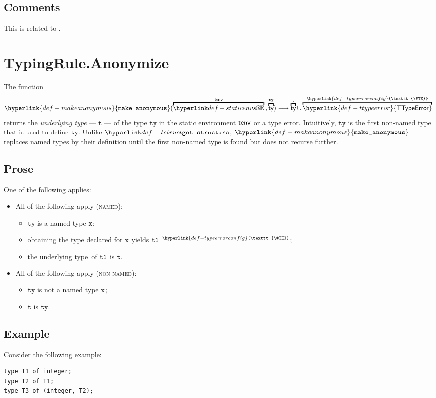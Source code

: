 \documentclass{book}
\newcommand\TTypeError[0]{\hyperlink{def-ttypeerror}{\textsf{TTypeError}}}
\newcommand\TypeErrorConfig[0]{\hyperlink{def-typeerrorconfig}{\texttt{\#TE}}}
\newcommand\ProseOrTypeError[0]{\hyperlink{def-proseortypeerror}{$^{\TypeErrorConfig}$}}
\newcommand\makeanonymous[0]{\hyperlink{def-makeanonymous}{\texttt{make\_anonymous}}}
\newcommand\underlyingtype[0]{\hyperlink{def-underlyingtype}{underlying type}}
\newcommand\vt[0]{\texttt{t}}
\newcommand\tty[0]{\texttt{ty}}
\begin{document}
\subsection{Comments}
This is related to .

\section{TypingRule.Anonymize \label{sec:anonymize}}
\hypertarget{def-makeanonymous}{}
\hypertarget{def-underlyingtype}{}
The function
\[
  \makeanonymous(\overname{\staticenvs}{\tenv} \aslsep \overname{\ty}{\tty}) \aslto \overname{\ty}{\vt} \cup \overname{\TTypeError}{\TypeErrorConfig}
\]
returns the \emph{\underlyingtype} --- $\vt$ --- of the type $\tty$ in the static environment $\textsf{tenv}$ or a type error.
Intuitively, $\tty$ is the first non-named type that is used to define $\tty$. Unlike $\tstruct$,
$\makeanonymous$ replaces named types by their definition until the first non-named type is found but
does not recurse further.

\subsection{Prose}
One of the following applies:
\begin{itemize}
  \item All of the following apply (\textsc{named}):
  \begin{itemize}
    \item $\tty$ is a named type $\texttt{x}$;
    \item obtaining the type declared for $\texttt{x}$ yields $\texttt{t1}$ \ProseOrTypeError;
    \item the \underlyingtype\ of $\texttt{t1}$ is $\vt$.
  \end{itemize}

  \item All of the following apply (\textsc{non-named}):
  \begin{itemize}
    \item $\tty$ is not a named type $\texttt{x}$;
    \item $\vt$ is $\tty$.
  \end{itemize}
\end{itemize}

\subsection{Example}
Consider the following example:
\begin{verbatim}
type T1 of integer;
type T2 of T1;
type T3 of (integer, T2);
\end{verbatim}
\end{document}
